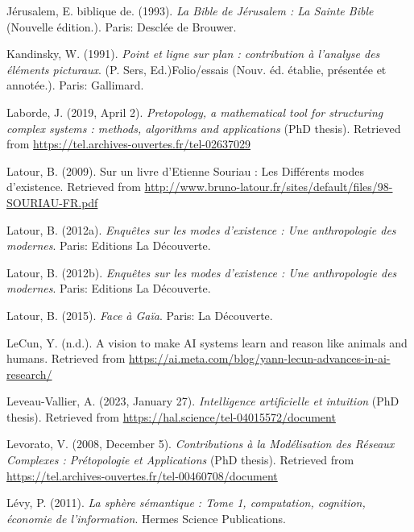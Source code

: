 \documentclass[
  a4paper,
  DIV=11,
  numbers=noendperiod]{scrreprt}
\newlength{\cslhangindent}
\newenvironment{CSLReferences}[2] %
 {\begin{list}{}{%
  \setlength{\itemindent}{0pt}
  \setlength{\leftmargin}{0pt}
  \setlength{\parsep}{0pt}
  \ifodd #1
   \setlength{\leftmargin}{\cslhangindent}
   \setlength{\itemindent}{-1\cslhangindent}
  \fi
  \setlength{\itemsep}{#2\baselineskip}}}
 {\end{list}}
\begin{document}
\begin{CSLReferences}{1}{0}
Jérusalem, E. biblique de. (1993). \emph{La Bible de Jérusalem : La
Sainte Bible} (Nouvelle édition.). Paris: Desclée de Brouwer.

Kandinsky, W. (1991). \emph{Point et ligne sur plan : contribution à
l'analyse des éléments picturaux}. (P. Sers, Ed.)Folio/essais (Nouv. éd.
établie, présentée et annotée.). Paris: Gallimard.

Laborde, J. (2019, April 2). \emph{Pretopology, a mathematical tool for
structuring complex systems : methods, algorithms and applications} (PhD
thesis). Retrieved from
\url{https://tel.archives-ouvertes.fr/tel-02637029}

Latour, B. (2009). Sur un livre d{'}Etienne Souriau : Les Différents
modes d{'}existence. Retrieved from
\url{http://www.bruno-latour.fr/sites/default/files/98-SOURIAU-FR.pdf}

Latour, B. (2012a). \emph{Enquêtes sur les modes d'existence : Une
anthropologie des modernes}. Paris: Editions La Découverte.

Latour, B. (2012b). \emph{Enquêtes sur les modes d'existence : Une
anthropologie des modernes}. Paris: Editions La Découverte.

Latour, B. (2015). \emph{Face à Gaïa}. Paris: La Découverte.

LeCun, Y. (n.d.). A vision to make AI systems learn and reason like
animals and humans. Retrieved from
\url{https://ai.meta.com/blog/yann-lecun-advances-in-ai-research/}

Leveau-Vallier, A. (2023, January 27). \emph{Intelligence artificielle
et intuition} (PhD thesis). Retrieved from
\url{https://hal.science/tel-04015572/document}

Levorato, V. (2008, December 5). \emph{Contributions à la Modélisation
des Réseaux Complexes : Prétopologie et Applications} (PhD thesis).
Retrieved from
\url{https://tel.archives-ouvertes.fr/tel-00460708/document}

Lévy, P. (2011). \emph{La sphère sémantique : Tome 1, computation,
cognition, économie de l'information}. Hermes Science Publications.


\end{CSLReferences}
\end{document}
